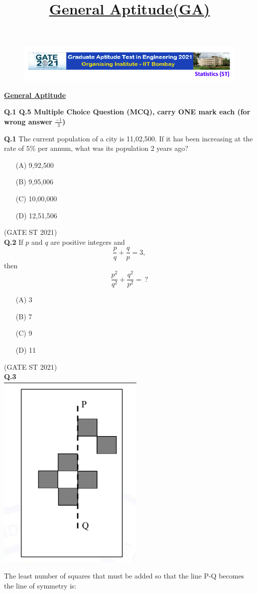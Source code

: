 \documentclass[journal,12pt,onecolumn]{IEEEtran}
\title{\textbf{\underline{General Aptitude(GA)}}}
\author{}
\date{}
\theoremstyle{remark}
\begin{document}
\begin{figure}
 \centering
    \includegraphics[width=1\linewidth]{figs/0.png} 
\end{figure}

\textbf{\underline{General Aptitude}}

\textbf{Q.1 \text{-} Q.5 Multiple Choice Question (MCQ), carry ONE mark each (for wrong answer $\frac{-1}{3}$)}

\textbf{Q.1} 
The current population of a city is 11,02,500. If it has been increasing at the rate of $5\%$ per annum, what was its population 2 years ago?

\begin{enumerate}
\item[(A)] 9,92,500
\item[(B)] 9,95,006
\item[(C)] 10,00,000
\item[(D)] 12,51,506
\end{enumerate}

\hfill (GATE ST 2021)\\

\textbf{Q.2}
If $p$ and $q$ are positive integers and
\[
\frac{p}{q} + \frac{q}{p} = 3,
\]
then
\[
\frac{p^{2}}{q^{2}} + \frac{q^{2}}{p^{2}} = \ ?
\]
\begin{enumerate}
\item[(A)] 3
\item[(B)] 7
\item[(C)] 9
\item[(D)] 11
\end{enumerate}

\hfill (GATE ST 2021) \\

\textbf{Q.3}    \\
\includegraphics[width=0.2\linewidth]{figs/3.png} 


The least number of squares that must be added so that the line P-Q becomes the line of symmetry is:
\end{document}
